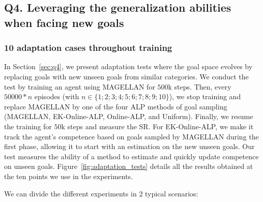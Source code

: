 

\subsection{Q4. Leveraging the generalization abilities when facing new goals} \label{app:additional_results_q4}

\subsubsection{10 adaptation cases throughout training}
\label{app:10_adap_cases_throughout_training}

In Section~\ref{sec:q4}, we present adaptation tests where the goal space evolves by replacing goals with new unseen goals from similar categories. We conduct the test by training an agent using MAGELLAN for $500$k steps. Then, every $50000 *n$ episodes (with $n \in \{1; 2; 3; 4; 5; 6; 7; 8; 9; 10\}$), we stop training and replace MAGELLAN by one of the four ALP methods of goal sampling (MAGELLAN, EK-Online-ALP, Online-ALP, and Uniform). Finally, we resume the training for $50$k steps and measure the SR. For EK-Online-ALP, we make it track the agent's competence based on goals sampled by MAGELLAN during the first phase, allowing it to start with an estimation on the new unseen goals. Our test measures the ability of a method to estimate and quickly update competence on unseen goals. Figure~\ref{fig:adaptation_tests} details all the results obtained at the ten points we use in the experiments. 

We can divide the different experiments in $2$ typical scenarios:

